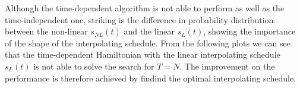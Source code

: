     \noindent
    Although the time-dependent algorithm is not able to perform as well as the time-independent one, striking is the difference in probability distribution between the non-linear $s_{NL}(t)$ and the linear $s_L(t)$, showing the importance of the shape of the interpolating schedule. From the following plots we can see that the time-dependent Hamiltonian with the linear interpolating schedule $s_L(t)$ is not able to solve the search for $T=N$. The improvement on the performance is therefore achieved by findind the optimal interpolating schedule.

    
